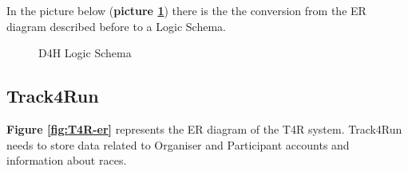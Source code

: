 In the picture below (\textbf{picture \ref{fig:D4H-Logic-Schema}}) there is the the conversion from the ER diagram described before to a Logic Schema.

\begin{figure}[H]
    \centering
    \caption{D4H Logic Schema}
    \label{fig:D4H-Logic-Schema}
\end{figure}


\subsection{Track4Run}

\textbf{Figure \ref{fig:T4R-er}} represents the ER diagram of the T4R system. Track4Run needs to store data related to Organiser and Participant accounts and information about races.

